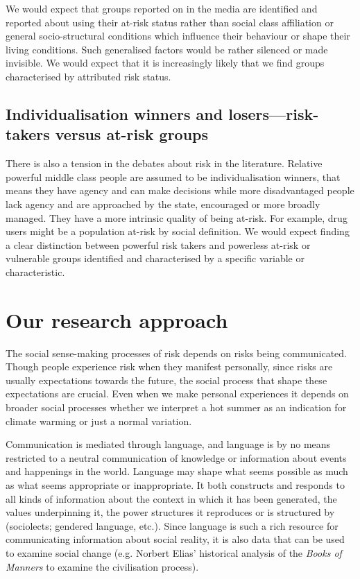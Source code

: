 \documentclass{report}
\begin{document}
We would expect that groups reported on in the media are identified and reported about using their at-risk status rather than social class affiliation or general socio-structural conditions which influence their behaviour or shape their living conditions. Such generalised factors would be rather silenced or made invisible. We would expect that it is increasingly likely that we find groups characterised by attributed risk status.

\subsection*{Individualisation winners and losers---risk-takers versus at-risk groups}

There is also a tension in the debates about risk in the literature. Relative powerful middle class people are assumed to be individualisation winners, that means they have agency and can make decisions while more disadvantaged people lack agency and are approached by the state, encouraged or more broadly managed. They have a more intrinsic quality of being at-risk. For example, drug users might be a population at-risk by social definition. We would expect finding a clear distinction between powerful risk takers and powerless at-risk or vulnerable groups identified and characterised by a specific variable or characteristic.


\section{Our research approach}

The social sense-making processes of risk depends on risks being communicated. Though people experience risk when they manifest personally, since risks are usually expectations towards the future, the social process that shape these expectations are crucial. Even when we make personal experiences it depends on broader social processes whether we interpret a hot summer as an indication for climate warming or just a normal variation.

Communication is mediated through language, and language is by no means restricted to a neutral communication of knowledge or information about events and happenings in the world. Language may shape what seems possible as much as what seems appropriate or inappropriate. It both constructs and responds to all kinds of information about the context in which it has been generated, the values underpinning it, the power structures it reproduces or is structured by (sociolects; gendered language, etc.). Since language is such a rich resource for communicating information about social reality, it is also data that can be used to examine social change (e.g. Norbert Elias' historical analysis of the \emph{Books of Manners} to examine the civilisation process). 
\end{document}
